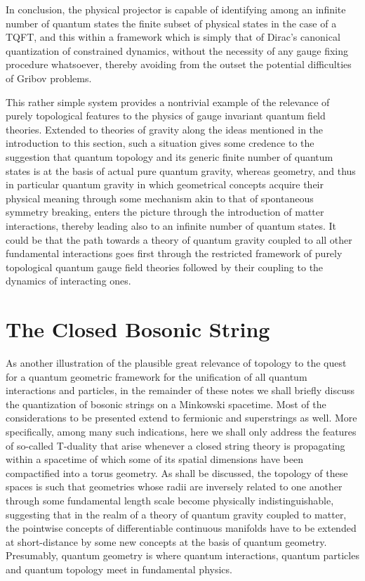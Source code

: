 \documentclass[a4paper,11pt]{article}
\begin{document}
In conclusion, the physical projector is capable of identifying among an
infinite number of quantum states the finite subset of physical states
in the case of a TQFT, and this within a framework which is simply that
of Dirac's canonical quantization of constrained dynamics, without the
necessity of any gauge fixing procedure whatsoever, thereby avoiding from 
the outset the potential difficulties of Gribov problems.

This rather simple system provides a nontrivial example of the relevance
of purely topological features to the physics of gauge invariant
quantum field theories. Extended to theories of gravity along the
ideas mentioned in the introduction to this section, such a situation
gives some credence to the suggestion\cite{Wit1,Wit2,Wit3} that quantum 
topology and its generic finite number of quantum states is at the basis of 
actual pure quantum gravity,
whereas geometry, and thus in particular quantum gravity in which
geometrical concepts acquire their phy\-si\-cal meaning through some
mechanism akin to that of spontaneous symmetry breaking, enters the picture
through the introduction of matter interactions, thereby leading also
to an infinite number of quantum states. It could be that the path
towards a theory of quantum gravity coupled to all other fundamental
interactions goes first through the restricted framework of purely 
topological quantum gauge field theories followed by their coupling to the
dynamics of interacting ones.

\section{The Closed Bosonic String}
\label{Sect7}

As another illustration of the plausible great relevance of topology to
the quest for a quantum geometric framework for the unification of all
quantum interactions and particles, in the remainder of these notes we
shall briefly discuss the quantization of bosonic strings on a Minkowski
spacetime.\cite{Pol,GSW,JG10} Most of the considerations to be presented 
extend to fermionic
and superstrings as well. More specifically, among many such indications,
here we shall only address the features of so-called T-duality that
arise whenever a closed string theory is propagating within a spacetime
of which some of its spatial dimensions have been compactified into
a torus geometry. As shall be discussed, the to\-po\-lo\-gy of these spaces
is such that geometries whose radii are inversely related to one another
through some fundamental length scale become physically indistinguishable,
suggesting that in the realm of a theory of quantum gravity coupled to
matter, the pointwise concepts of differentiable continuous manifolds have 
to be extended at short-distance by some new concepts at the basis of
quantum geometry. Presumably, quantum geometry is where quantum interactions,
quantum particles and quantum topology meet in fundamental physics.
\end{document}
